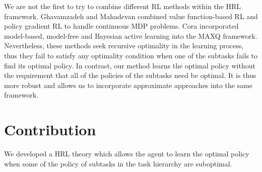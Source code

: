 


We are not the first to try to combine different RL methods within the HRL framework.  
Ghavamzadeh and Mahadevan \cite{HybridPolicy} combined value function-based RL and policy gradient RL to handle
continuous MDP problems. Cora \cite{Vlad} incorporated model-based, model-free and Bayesian active learning into the MAXQ framework.
Nevertheless, these methods seek recursive optimality in the learning process, 
thus they fail to satisfy any optimality condition when one of the subtasks
fails to find its optimal policy.
In contrast, our method learns the optimal policy without the requirement that 
all of the policies of the subtasks need be optimal. It is thus more robust and allows us to incorporate approximate
approaches into the same framework.


\section{Contribution}
We developed a HRL theory which allows the agent to learn the optimal policy 
when some of the policy of subtasks in the task hierarchy are suboptimal.

